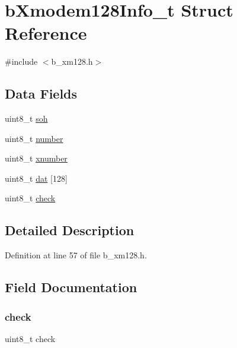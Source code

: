 \hypertarget{structb_xmodem128_info__t}{}\section{b\+Xmodem128\+Info\+\_\+t Struct Reference}
\label{structb_xmodem128_info__t}


{\ttfamily \#include $<$b\+\_\+xm128.\+h$>$}

\subsection*{Data Fields}
\begin{DoxyCompactItemize}
\item 
uint8\+\_\+t \mbox{\hyperlink{structb_xmodem128_info__t_a87bdcb2d9de9c3eef834e0af26f2d5e3}{soh}}
\item 
uint8\+\_\+t \mbox{\hyperlink{structb_xmodem128_info__t_af57eaec6f3dec6de717735725c9908a6}{number}}
\item 
uint8\+\_\+t \mbox{\hyperlink{structb_xmodem128_info__t_ae817be61f4d69f01a76ff417b23f5a54}{xnumber}}
\item 
uint8\+\_\+t \mbox{\hyperlink{structb_xmodem128_info__t_ab02bda4989472488cf520fd11c64a230}{dat}} \mbox{[}128\mbox{]}
\item 
uint8\+\_\+t \mbox{\hyperlink{structb_xmodem128_info__t_ad47d5b159b4c95a163edac9d1b659751}{check}}
\end{DoxyCompactItemize}


\subsection{Detailed Description}


Definition at line 57 of file b\+\_\+xm128.\+h.



\subsection{Field Documentation}
\mbox{\label{structb_xmodem128_info__t_ad47d5b159b4c95a163edac9d1b659751}} 
\subsubsection{\texorpdfstring{check}{check}}
{\footnotesize\ttfamily uint8\+\_\+t check}



